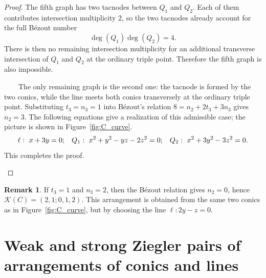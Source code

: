 \documentclass[11pt]{article}
\theoremstyle{plain}
\theoremstyle{definition}
\newtheorem{remark}[thm]{Remark}
\begin{document}
\begin{proof}
The fifth graph has two tacnodes between $Q_1$ and $Q_2$. Each of them contributes intersection multiplicity $2$, so the two tacnodes already account for the full B\'ezout number
\[
\deg(Q_1)\deg(Q_2)=4.
\]
There is then no remaining intersection multiplicity for an additional transverse intersection of $Q_1$ and $Q_2$ at the ordinary triple point. Therefore the fifth graph is also impossible.

\noindent
\begin{minipage}[t]{0.6\textwidth}
\vspace{0pt}
\ \ \ \ The only remaining graph is the second one: the tacnode is formed by the two conics, while the line meets both conics transversely at the ordinary triple point. Substituting $t_3=n_3=1$ into B\'ezout's relation $8=n_2+2t_3+3n_3$ gives $n_2=3$. The following equations give a realization of this admissible case; the picture is shown in Figure~\ref{fig:C_curve}.
$$\ell: \ x+3y=0; \hspace{0.3cm} Q_1: \ x^2+y^2-yz-2z^2=0; \hspace{0.3cm} Q_2: \ x^2+3y^2-3z^2=0.$$
This completes the proof.
\end{minipage}
\hfill
\begin{minipage}[t]{0.4\textwidth}
\vspace{0pt}
\centering
{}
\label{fig:C_curve}
\end{minipage}
\end{proof}

\begin{remark}
    If $t_3=1$ and $n_3=2$, then the B\'ezout relation gives $n_2=0$, hence $\mathcal{K}(C)=(2,1;0,1,2)$. This arrangement is obtained from the same two conics as in Figure~\ref{fig:C_curve}, but by choosing the line $\ell:2y-z=0$.
\end{remark}



\section{Weak and strong Ziegler pairs of arrangements of conics and lines} \label{Ziegler}
\end{document}
